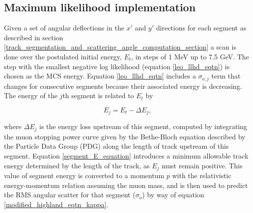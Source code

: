 \documentclass[a4paper,11pt]{article}
\begin{document}
\subsection{Maximum likelihood implementation}\label{maximum_likelihood_section}

Given a set of angular deflections in the $x'$ and $y'$ directions for each segment as described in section \ref{track_segmentation_and_scattering_angle_computation_section} a scan is done over the postulated initial energy, $E_t$, in steps of 1 MeV up to 7.5 GeV. The step with the smallest negative log likelihood (equation \ref{leo_llhd_eqtn}) is chosen as the MCS energy. Equation \ref{leo_llhd_eqtn} includes a $\sigma_{o,j}$ term that changes for consecutive segments because their associated energy is decreasing. The energy of the $j$th segment is related to $E_t$ by

\begin{equation}\label{segment_E_equation}
E_{j} = E_t - \Delta E_{j},
\end{equation}

\noindent where $\Delta E_{j}$ is the energy loss upstream of this segment, computed by integrating the muon stopping power curve given by the Bethe-Bloch equation described by the Particle Data Group (PDG) \cite{stoppingpowersource} along the length of track upstream of this segment. Equation \ref{segment_E_equation} introduces a minimum allowable track energy determined by the length of the track, as $E_{j}$ must remain positive. This value of segment energy is converted to a momentum $p$ with the relativistic energy-momentum relation assuming the muon mass, and is then used to predict the RMS angular scatter for that segment ($\sigma_o$) by way of equation \ref{modified_highland_eqtn_kappa}. 
\end{document}
